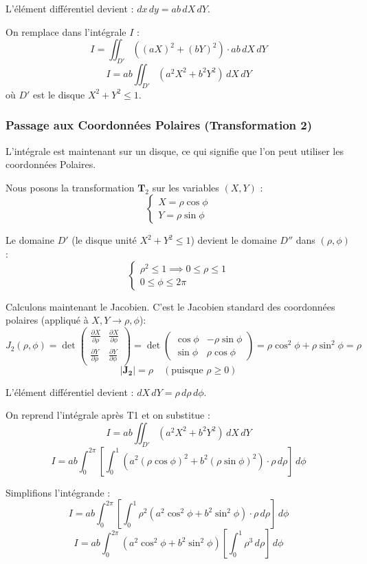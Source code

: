 \documentclass[french]{yLectureNote}
\begin{document}
L'élément différentiel devient : $dx\,dy = ab \,dX\,dY$.

On remplace dans l'intégrale $I$ :
$$I = \iint_{D'} ((aX)^2 + (bY)^2) \cdot ab \,dX\,dY$$
$$I = ab \iint_{D'} (a^2X^2 + b^2Y^2) \,dX\,dY$$
où $D'$ est le disque $X^2 + Y^2 \leq 1$.
\subsubsection{Passage aux Coordonnées Polaires (Transformation 2)}

L'intégrale est maintenant sur un disque, ce qui signifie que l'on peut utiliser les coordonnées Polaires.

Nous posons la transformation $\mathbf{T}_2$ sur les variables $(X, Y)$ :
$$\begin{cases} X = \rho \cos \phi \\ Y = \rho \sin \phi \end{cases}$$

Le domaine $D'$ (le disque unité $X^2 + Y^2 \leq 1$) devient le domaine $D''$ dans $(\rho, \phi)$ :
$$\begin{cases} \rho^2 \leq 1 \implies 0 \leq \rho \leq 1 \\ 0 \leq \phi \leq 2\pi \end{cases}$$

Calculons maintenant le Jacobien. C'est le Jacobien standard des coordonnées polaires (appliqué à $X, Y \to \rho, \phi$):
$$J_2(\rho, \phi) = \det \begin{pmatrix}
\frac{\partial X}{\partial \rho} & \frac{\partial X}{\partial \phi} \\
\frac{\partial Y}{\partial \rho} & \frac{\partial Y}{\partial \phi}
\end{pmatrix} = \det \begin{pmatrix}
\cos \phi & -\rho \sin \phi \\
\sin \phi & \rho \cos \phi
\end{pmatrix} = \rho \cos^2 \phi + \rho \sin^2 \phi = \rho$$
$$\mathbf{|J_2|} = \rho \quad (\text{puisque } \rho \ge 0)$$

L'élément différentiel devient : $dX\,dY = \rho \,d\rho\,d\phi$.

On reprend l'intégrale après T1 et on substitue :
$$I = ab \iint_{D'} (a^2X^2 + b^2Y^2) \,dX\,dY$$
$$I = ab \int_0^{2\pi} \left[ \int_0^1 \left( a^2(\rho \cos\phi)^2 + b^2(\rho \sin\phi)^2 \right) \cdot \rho \,d\rho \right] \,d\phi$$

Simplifions l'intégrande :
$$I = ab \int_0^{2\pi} \left[ \int_0^1 \rho^2 (a^2 \cos^2\phi + b^2 \sin^2\phi) \cdot \rho \,d\rho \right] \,d\phi$$
$$I = ab \int_0^{2\pi} (a^2 \cos^2\phi + b^2 \sin^2\phi) \left[ \int_0^1 \rho^3 \,d\rho \right] \,d\phi$$
\end{document}
